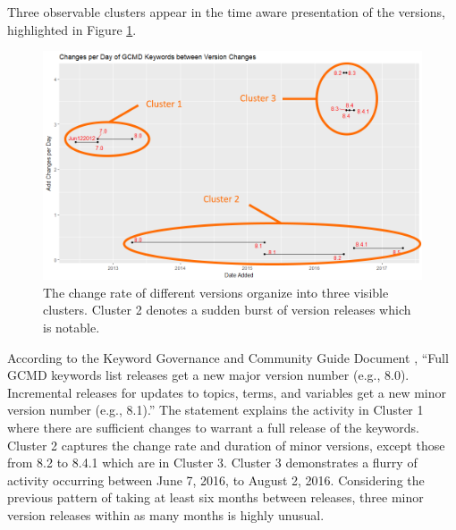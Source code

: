 Three observable clusters appear in the time aware presentation of the versions, highlighted in Figure \ref{GCMDPlot1Cluster}.
\begin{figure}%
	\centering
	\includegraphics[scale=0.56]{figures/GCMDPlot1_Cluster.png}
	\caption[Global Change Master Directory count distributed over time with clusters marked.]{The change rate of different versions organize into three visible clusters. Cluster 2 denotes a sudden burst of version releases which is notable.}
	\label{GCMDPlot1Cluster}
\end{figure}
According to the Keyword Governance and Community Guide Document \cite{gcmd_gov}, ``Full GCMD keywords list releases get a new major version number (e.g., 8.0). Incremental releases for updates to topics, terms, and variables get a new minor version number (e.g., 8.1).”
The statement explains the activity in Cluster 1 where there are sufficient changes to warrant a full release of the keywords.
Cluster 2 captures the change rate and duration of minor versions, except those from 8.2 to 8.4.1 which are in Cluster 3.
Cluster 3 demonstrates a flurry of activity occurring between June 7, 2016, to August 2, 2016.
Considering the previous pattern of taking at least six months between releases, three minor version releases within as many months is highly unusual.

